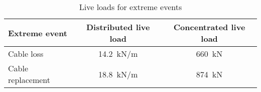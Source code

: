 \begin{table}[H]
\centering
\caption{Live loads for extreme events}
\label{tab:live_load_extreme}
\begin{tabular}{lcc}
\hline
Extreme event     & Distributed live load & Concentrated live load \\ \hline
Cable loss  & \SI{14.2}{kN/m} & \SI{660}{kN} \\
Cable replacement & \SI{18.8}{kN/m} & \SI{874}{kN} \\ \hline
\end{tabular}
\end{table}
